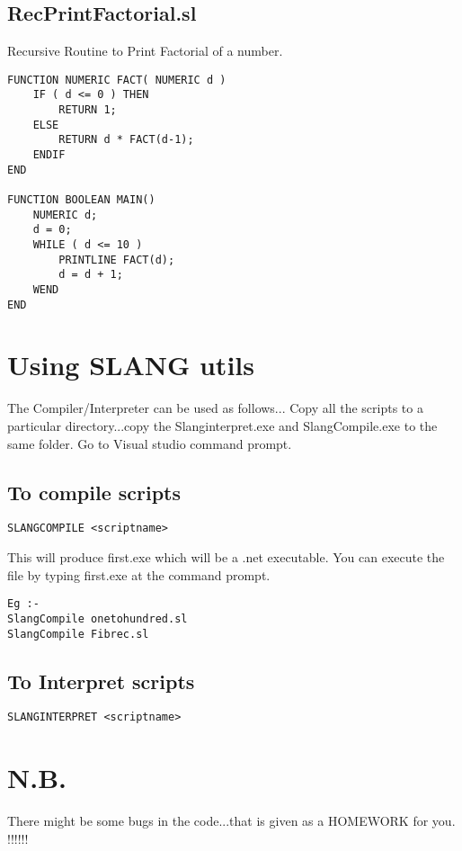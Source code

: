 \subsection{RecPrintFactorial.sl}
Recursive Routine to Print Factorial of a number.
\lstset{style=csharp}
\begin{lstlisting}
FUNCTION NUMERIC FACT( NUMERIC d )
	IF ( d <= 0 ) THEN
		RETURN 1;
	ELSE
		RETURN d * FACT(d-1);
	ENDIF
END

FUNCTION BOOLEAN MAIN()
	NUMERIC d;
	d = 0;
	WHILE ( d <= 10 )
		PRINTLINE FACT(d);
		d = d + 1;
	WEND
END
\end{lstlisting}
\section{Using SLANG utils}
The Compiler/Interpreter can be used as follows... Copy all the scripts to a particular directory...copy the Slanginterpret.exe and SlangCompile.exe to the same folder. Go to Visual studio command prompt.
\subsection{To compile scripts}
\begin{verbatim}
SLANGCOMPILE <scriptname>
\end{verbatim}
This will produce first.exe which will be a .net executable. You can execute the file by typing first.exe at the command prompt.
\begin{verbatim}
Eg :-
SlangCompile onetohundred.sl
SlangCompile Fibrec.sl
\end{verbatim}
\subsection{To Interpret scripts}
\begin{verbatim}
SLANGINTERPRET <scriptname>
\end{verbatim}
\section{N.B.}
There might be some bugs in the code...that is given as a HOMEWORK for you. !!!!!!

